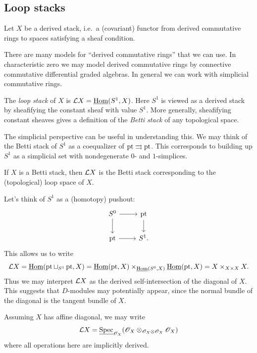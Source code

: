 \documentclass{article}
\begin{document}
\subsection{Loop stacks}

Let $X$ be a derived stack, i.e.\ a (covariant) functor from derived commutative rings to spaces satisfying a sheaf condition.

\begin{rmk}
  There are many models for ``derived commutative rings'' that we can use.
  In characteristic zero we may model derived commutative rings by connective commutative differential graded algebras.
  In general we can work with simplicial commutative rings.
\end{rmk}

The \emph{loop stack} of $X$ is $\mathcal{L} X = \underline{\operatorname{Hom}}(S^1, X)$.
Here $S^1$ is viewed as a derived stack by sheafifying the constant sheaf with value $S^1$.
More generally, sheafifying constant sheaves gives a definition of the \emph{Betti stack} of any topological space.

\begin{rmk}
  The simplicial perspective can be useful in understanding this.
  We may think of the Betti stack of $S^1$ as a coequalizer of $\operatorname{pt} \rightrightarrows \operatorname{pt}$.
  This corresponds to building up $S^1$ as a simplicial set with nondegenerate $0$- and $1$-simplices.
\end{rmk}

\begin{ex}
  If $X$ is a Betti stack, then $\mathcal{L} X$ is the Betti stack corresponding to the (topological) loop space of $X$.
\end{ex}

Let's think of $S^1$ as a (homotopy) pushout:
\[
  \begin{tikzcd}
    S^0 \rar \dar & \pt \dar \\
    \pt \rar & S^1.
  \end{tikzcd}
\]
This allows us to write
\[
  \mathcal{L} X = \underline{\operatorname{Hom}}(\operatorname{pt} \sqcup_{S^1} \operatorname{pt}, X) = \underline{\operatorname{Hom}}(\operatorname{pt}, X) \times_{\underline{\operatorname{Hom}}(S^0, X)} \underline{\operatorname{Hom}}(\operatorname{pt}, X) = X \times_{X \times X} X. 
\]
Thus we may interpret $\mathcal{L} X$ as the derived self-intersection of the diagonal of $X$.
This suggests that $D$-modules may potentially appear, since the normal bundle of the diagonal is the tangent bundle of $X$.

Assuming $X$ has affine diagonal, we may write
\[
  \mathcal{L} X = \underline{\operatorname{Spec}}_{\mathscr{O}_X} (\mathscr{O}_X \otimes_{\mathscr{O}_X \otimes \mathscr{O}_X} \mathscr{O}_X)
\]
where all operations here are implicitly derived.
\end{document}

